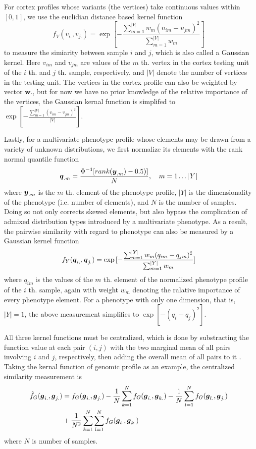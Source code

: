 For cortex profiles whose variants (the vertices) take continuous values within $[0,1]$, we use the euclidian distance based kernel function
\label{eq:wSV}
\[ f_V(v_{i.},v_{j.}) = \exp{ [-\frac{\sum_{m=1}^{|V|}{w_m(u_{im}-u_{jm})^2}} {\sum_{m=1}^{|V|}{w_m}}] } \]
to measure the simiarity between sample $i$ and $j$, which is also called a Gaussian kernel. Here $v_{im}$ and $v_{jm}$ are values of the $m$ th. vertex in the cortex testing unit of the $i$ th. and $j$ th. sample, respectively, and $|V|$ denote the number of vertices in the testing unit. The vertices in the cortex profile can also be weighted by vector $\boldsymbol{w}.$, but for now we have no prior knowledge of the relative importance of the vertices, the Gaussian kernal function is simplifed to $\exp{[-\frac{\sum_{m=1}^{|V|}{(v_{im}-v_{jm})^2}} {|V|}]}$.

Lastly, for a multivariate phenotype profile whose elements may be drawn from a variety of unknown distributions, we first normalize its elements with the rank normal quantile function
\[ \boldsymbol{q}_{.m} = \frac{\Phi^{-1}[rank(\boldsymbol{y}_{.m}) - 0.5)]}{N}, \quad m = 1 \dots |Y| \]
where $\boldsymbol{y}_{.m}$ is the $m$ th. element of the phenotype profile, $|Y|$ is the dimensionality of the phenotype (i.e. number of elements), and $N$ is the number of samples. Doing so not only corrects skewed elements, but also bypass the complication of admixed distribution types introduced by a multivariate phenotype. As a result, the pairwise similarity with regard to phenotype can also be measured by a Gaussian kernel function
\[ f_Y(\boldsymbol{q}_{i.}, \boldsymbol{q}_{j.}) = \exp{[-\frac{\sum_{m=1}^{|Y|}{w_m(q_{im}-q_{jm})^2}} {\sum_{m=1}^{|Y|}{w_m}}]} \]
where $q_{im}$ is the values of the $m$ th. element of the normalized phenotype profile of the $i$ th. sample, again with weight $w_m$ denoting the ralative importance of every phenotype element. For a phenotype with only one dimension, that is, $|Y|=1$, the above measurement simplifies to $\exp{[-(q_i - q_j)^2]}$.

All three kernel functions must be centralized, which is done by substracting the function value at each pair $(i,j)$ with the two marginal mean of all pairs involving $i$ and $j$, respectively, then adding the overall mean of all pairs to it \cite{HWU}. Taking the kernal function of genomic profile as an example, the centralized similarity measurement is
\begin{align*}
  \tilde{f}_G(\boldsymbol{g}_{i.}, \boldsymbol{g}_{j.})
  &= f_G(\boldsymbol{g}_{i.}, \boldsymbol{g}_{j.})-\frac{1}{N} \sum_{k=1}^N{f_G(\boldsymbol{g}_{i.}, \boldsymbol{g}_{k.})}-\frac{1}{N}\sum_{l=1}^N{f_G(\boldsymbol{g}_{l.}, \boldsymbol{g}_{j.})} \\ 
  &+ \frac{1}{N^2} \sum_{k=1}^{N} \sum_{l=1}^{N} {f_G(\boldsymbol{g}_{l.}, \boldsymbol{g}_{k.})}
\end{align*}
where $N$ is number of samples. 

